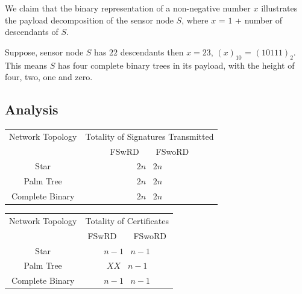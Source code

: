 \documentclass[%
  slidesonly,%
  semlayer%
  ]{seminar}                                  %
\begin{document}
\begin{slide}
        We claim that the binary representation of a non-negative number $x$ illustrates the payload decomposition of the sensor node $S$, where $x$ = $1$ + number of descendants of $S$.

        Suppose, sensor node $S$ has $22$ descendants then $x =23$, $(x)_{10}$ = $(10111)_{2}$. 
        This means $S$ has four complete binary trees in its payload, with the height of four, two, one and zero.
        \vfill
        \clearpage
      \subsection*{Analysis}
        \vfill
        \begin{tiny}
          \begin{table}
            \begin{center}
              \begin{tabular}{|c||c|}
                \hline
                Network Topology & Totality of Signatures Transmitted \\ 
                \cline{2-2}
                 & FSwRD \mbox{   } \vline \mbox{   } FSwoRD \\
                \hline
                \hline
                Star & $2n$ \vline \mbox{   }$2n$ \\
                \hline
                Palm Tree & $2n$ \vline \mbox{   }$2n$\\
                \hline
                Complete Binary & $2n$ \vline \mbox{   }$2n$\\
                \hline
              \end{tabular}
            \end{center}
          \end{table}

           \begin{table}
            \begin{center}
              \begin{tabular}{|c||c|}
                \hline
                Network Topology & Totality of Certificates \\ 
                \cline{2-2}
                 & FSwRD \mbox{   } \vline \mbox{   } FSwoRD \\
                \hline
                \hline
                Star & $n - 1$ \vline \mbox{   }$n -1$ \\
                \hline
                Palm Tree & $XX$ \vline \mbox{   }$n - 1$\\
                \hline
                Complete Binary & $n - 1$ \vline \mbox{   }$n - 1$\\
                \hline
              \end{tabular}
            \end{center}
          \end{table}
        \end{tiny}
        \vfill
        \clearpage 

\end{slide}
\end{document}
